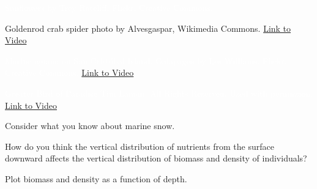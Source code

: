 \documentclass[t]{beamer}
\begin{document}
%

{
\begin{frame}[b,plain]
	\textcolor{white}{\tiny Sunflowers by Trey Ratcliff, Flickr, Creative Commons.}
\end{frame}
}

%

{
\begin{frame}[b,plain]
\tiny Goldenrod crab spider photo by Alvesgaspar, Wikimedia Commons.\hfill
\textcolor{white}{\href{https://www.youtube.com/watch?v=O9B_9XxZKJ8}{Link to Video}}
\end{frame}
}

%

{
\begin{frame}[b,plain]
	\tiny \textcolor{white}{Marine iguana on San Crist\'{o}bal Island, Galapagos by Les Williams, Flickr, Creative Commons.}\hfill
	\textcolor{white}{\href{https://www.youtube.com/watch?v=4tBWakZAGqU}{Link to Video}}
\end{frame}
}

%

{
\begin{frame}[b,plain]
	\tiny\textcolor{white}{Greater Bird of Paradise \textcopyright Tim Laman, All Rights Reserved. Used with permission. \hfill\href{http://www.youtube.com/watch?v=KIYkpwyKEhY}{Link to Video} }
\end{frame}
}

%

\begin{frame}[t]{Consider what you know about marine snow.}

\hangpara How do you think the vertical distribution of nutrients from the surface downward affects the vertical distribution of biomass and density of individuals?

\end{frame}

{
\begin{frame}[t]{Plot biomass and density as a function of depth.}

\end{frame}}

%
\end{document}
